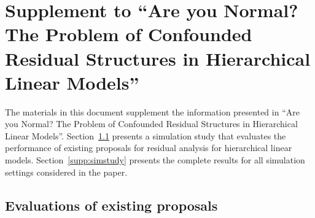 \documentclass[12pt]{article} %
\newcommand{\trans}{\ensuremath{^\prime}}
\newcommand{\var}{\ensuremath{\mathrm{Var}}}
\begin{document}
%
%
%
%





\clearpage

\appendix
\section{Supplement to ``Are you Normal? The Problem of Confounded Residual Structures in Hierarchical Linear Models''}

The materials in this document supplement the information presented in ``Are you Normal? The Problem of Confounded Residual Structures in Hierarchical Linear Models''. Section~\ref{supp:evals} presents a simulation study that evaluates the performance of existing proposals for residual analysis for hierarchical linear models. Section~\ref{supp:simstudy} presents the complete results for all simulation settings considered in the paper. 


\subsection{Evaluations of existing proposals}\label{supp:evals}
\end{document}
